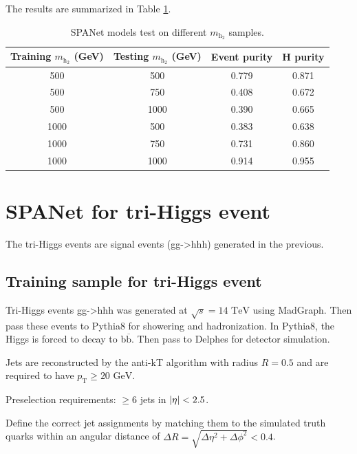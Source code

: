 \documentclass[12pt]{article}
\begin{document}
		The results are summarized in Table \ref{tab:SPANet_test_on_different_h2_mass}.
		\begin{table}[htpb]
			\centering
			\caption{SPANet models test on different $m_{\text{h}_2}$ samples.}
			\label{tab:SPANet_test_on_different_h2_mass}
			\begin{tabular}{cccc}
				Training $m_{\text{h}_2}$ (GeV) & Testing $m_{\text{h}_2}$ (GeV) & Event purity & H purity \\
				\hline 
				500      & 500     & 0.779        & 0.871    \\
				500      & 750     & 0.408        & 0.672    \\
				500      & 1000    &  0.390      &  0.665    \\
				1000     & 500    & 0.383        & 0.638   \\
				1000     & 750    & 0.731        & 0.860   \\
				1000     & 1000    & 0.914        & 0.955   
			\end{tabular}
		\end{table}

\section{SPANet for tri-Higgs event}%
\label{sec:spanet_for_trihiggs_event}
	The tri-Higgs events are signal events (gg->hhh) generated in the previous.

	\subsection{Training sample for tri-Higgs event}%
	\label{sub:training_sample_for_trihiggs_event}
		Tri-Higgs events gg->hhh was generated at $\sqrt{s} = \text{14 TeV}$ using MadGraph. Then pass these events to Pythia8 for showering and hadronization. In Pythia8, the Higgs is forced to decay to b$\overline{\text{b}}$. Then pass to Delphes for detector simulation.
	
		Jets are reconstructed by the anti-kT algorithm with radius $R=0.5$ and are required to have $p_\text{T}\ge \text{20 GeV}$.

		Preselection requirements: $\ge 6$ jets in  $\abs{\eta}<2.5$.

		Define the correct jet assignments by matching them to the simulated truth quarks within an angular distance of $\Delta R = \sqrt{\Delta\eta^2 + \Delta\phi^2}<0.4$.
\end{document}
